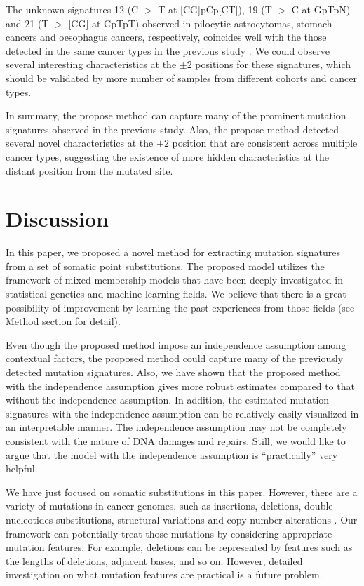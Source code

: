 The unknown signatures 12 (C $>$ T at [CG]pCp[CT]), 19 (T $>$ C at GpTpN) and 21 (T $>$ [CG] at CpTpT) observed in pilocytic astrocytomas, stomach cancers and oesophagus cancers, respectively,
coincides well with the those detected in the same cancer types in the previous study \cite{pmid23318258}.
We could observe several interesting characteristics at the $\pm 2$ positions for these signatures,
which should be validated by more number of samples from different cohorts and cancer types.


In summary, the propose method can capture many of the prominent mutation signatures observed in the previous study.
Also, the propose method detected several novel characteristics at the $\pm 2$ position that are consistent across multiple cancer types,
suggesting the existence of more hidden characteristics at the distant position from the mutated site.


\section*{Discussion}


In this paper, we proposed a novel method for extracting mutation signatures from a set of somatic point substitutions.
The proposed model utilizes the framework of mixed membership models
that have been deeply investigated in statistical genetics and machine learning fields.
We believe that there is a great possibility of improvement by learning the past experiences from those fields (see Method section for detail).


Even though the proposed method impose an independence assumption among contextual factors,
the proposed method could capture many of the previously detected mutation signatures.
Also, we have shown that the proposed method with the independence assumption gives more robust estimates compared to that without the independence assumption.
In addition, the estimated mutation signatures with the independence assumption can be relatively easily visualized in an interpretable manner.
The independence assumption may not be completely consistent with the nature of DNA damages and repairs.
Still, we would like to argue that the model with the independence assumption is ``practically'' very helpful.



We have just focused on somatic substitutions in this paper.
However, there are a variety of mutations in cancer genomes, 
such as insertions, deletions, double nucleotides substitutions, structural variations and copy number alterations \cite{meyerson2010advances, helleday2014mechanisms}.
Our framework can potentially treat those mutations by considering appropriate mutation features.
For example, deletions can be represented by features such as the lengths of deletions, adjacent bases, and so on.
However, detailed investigation on what mutation features are practical is a future problem.


